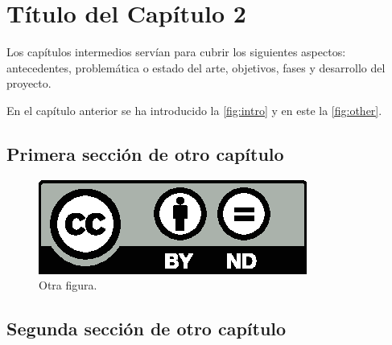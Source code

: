\chapter{Título del Capítulo 2}
\label{ch:dos}

\noindent Los capítulos intermedios servían para cubrir los siguientes aspectos: antecedentes, problemática o estado del arte, objetivos, fases y desarrollo del proyecto.

En el capítulo anterior se ha introducido la \autoref{fig:intro} y en este la \autoref{fig:other}. 

\section{Primera sección de otro capítulo}
\label{sec:ch2_1}

\begin{figure}[htb]
   \centering
   \includegraphics[width=0.5\linewidth]{images/licenses/by-nd}
   \caption{Otra figura.}
   \label{fig:other}
\end{figure}

\lipsum[3]

\section{Segunda sección de otro capítulo}

\noindent \lipsum[4-5]


